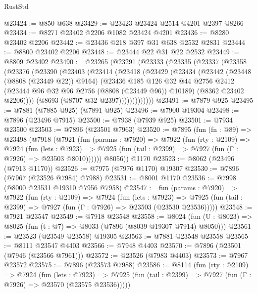 \begin{lexlean}{RustStd}
\begin{coremodule}
@23424 := @850 @638
@23429 := @23423 @23424 @2514 @4201 @2397 @8266
@23434 := @8271 @23402 @2206 @1082 @23424 @4201
@23436 := @8280 @23402 @2206
@23442 := @23436 @218 @397 @31 @638 @2532 @2831
@23444 := @8800 @23402 @2206
@23448 := @23444 @22 @31 @22 @2532
@23449 := @8809 @23402
@23490 := @23265
    (@23291
      (@23333
        (@23335
          (@23337
            (@23358
              (@23376
                (@23390
                  (@23403
                    (@23414
                      (@23418
                        (@23429
                          (@23434
                            (@23442
                              (@23448 (@8808 (@23449 @22)) @9164)
                              (@23436
                                @185
                                @126
                                @32
                                @44
                                @2756
                                @2412
                                (@23444 @96 @32 @96 @2756 (@8808 (@23449 @96)) @10189)
                                (@8362 @23402 @2206))))
                          (@8693 (@8707 @32 @2397)))))))))))))
@23491 := @7879 @925
@23495 := @7881 (@7885 @925) (@7891 @925)
@23496 := @7900 @19304
@23498 := @7896 (@23496 @7915)
@23500 := @7938 (@7939 @925)
@23501 := @7934 @23500
@23503 := @7896 (@23501 @7963)
@23520 := @7895
    (fun (fn : @89) =>
    @23498
      (@7918
        (@7921
          (fun (params : @7920) =>
          @7922
            (fun (rty : @2109) =>
            @7924
              (fun (lets : @7923) =>
              @7925 (fun (tail : @2399) => @7927 (fun (Γ : @7926) => @23503 @8010))))))
        @8056))
    @1170
@23523 := @8062 (@23496 (@7913 @1170))
@23526 := @7975 (@7976 @1170) @19307
@23530 := @7896 (@7967 (@23526 @7984) @7988)
@23531 := @8001 @1170
@23536 := @7998 (@8000 @23531 @19310 @7956 @7958)
@23547 := fun (params : @7920) =>
  @7922
    (fun (rty : @2109) =>
    @7924
      (fun (lets : @7923) =>
      @7925 (fun (tail : @2399) => @7927 (fun (Γ : @7926) => @23503 (@23530 @23536)))))
@23548 := @7921 @23547
@23549 := @7918 @23548
@23558 := @8024
    (fun (U : @8023) => @8025 (fun (t : @7) => @8033 (@7896 (@8039 @19307 @7914) @8050)))
@23561 := @23523 (@23549 @23558) @19305
@23563 := @7881 @23548 @23558
@23565 := @8111 @23547 @4403
@23566 := @7948 @4403
@23570 := @7896 (@23501 (@7946 (@23566 @7961)))
@23572 := @23526 (@7983 @4403)
@23573 := @7967 @23572
@23575 := @7896 (@23573 @7988)
@23586 := @8114
    (fun (rty : @2109) =>
    @7924
      (fun (lets : @7923) =>
      @7925 (fun (tail : @2399) => @7927 (fun (Γ : @7926) => @23570 (@23575 @23536)))))

\end{coremodule}
\end{lexlean}
